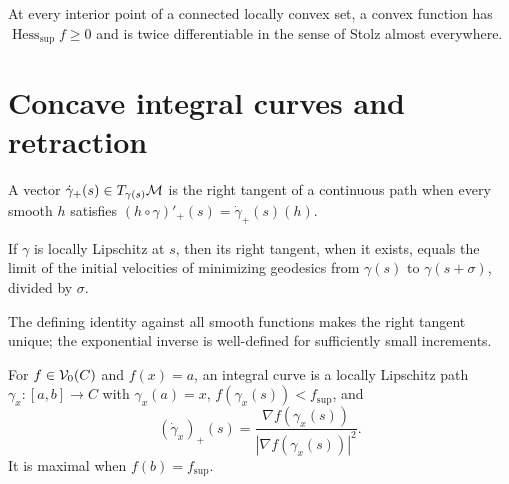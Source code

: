 \begin{lemma}
\label{lem:chow-iii-h39-convex-support-hessian}
At every interior point of a connected locally convex set, a convex function has
$\operatorname{Hess}_{\mathrm{sup}}f\ge0$ and is twice differentiable in the sense of
Stolz almost everywhere.
\end{lemma}

\section{Concave integral curves and retraction}

\begin{definition}
\label{def:chow-iii-h40-right-tangent}
A vector $\dot\gamma_+(s)\in T_{\gamma(s)}\M$ is the right tangent of a continuous path
when every smooth $h$ satisfies $(h\circ\gamma)'_+(s)=\dot\gamma_+(s)(h)$.
\end{definition}

\begin{lemma}
\label{lem:chow-iii-h41-right-tangent-geodesics}
If $\gamma$ is locally Lipschitz at $s$, then its right tangent, when it exists, equals
the limit of the initial velocities of minimizing geodesics from $\gamma(s)$ to
$\gamma(s+\sigma)$, divided by $\sigma$.
\end{lemma}

\begin{remark}
\label{rem:chow-iii-h42-right-tangent-uniqueness}
The defining identity against all smooth functions makes the right tangent unique;
the exponential inverse is well-defined for sufficiently small increments.
\end{remark}

\begin{definition}
\label{def:chow-iii-h43-integral-curve}
For $f\in\Vzero(C)$ and $f(x)=a$, an integral curve is a locally Lipschitz path
$\gamma_x:[a,b]\to C$ with $\gamma_x(a)=x$, $f(\gamma_x(s))<f_{\sup}$, and
\[
(\dot\gamma_x)_+(s)=\frac{\nabla f(\gamma_x(s))}{|\nabla f(\gamma_x(s))|^2}.
\]
It is maximal when $f(b)=f_{\sup}$.
\end{definition}

